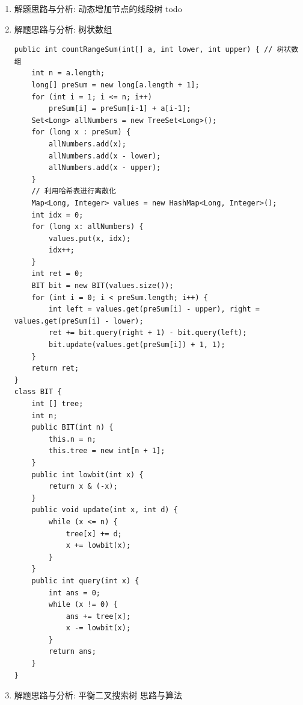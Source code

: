 \documentclass[9pt, b5paaper]{book}
\begin{document}
\begin{enumerate}
\begin{itemize}
\begin{verbatim}
    node.lchild = build(left, mid);
    node.rchild = build(mid + 1, right);
    return node;
}
public int count(SegNode root, int left, int right) {
    if (left > root.hi || right < root.lo) 
        return 0;
    if (left <= root.lo && root.hi <= right) 
        return root.add;
    return count(root.lchild, left, right) + count(root.rchild, left, right);
}
public void insert(SegNode root, int val) {
    root.add++;
    if (root.lo == root.hi) 
        return;
    int mid = (root.lo + root.hi) / 2;
    if (val <= mid) 
        insert(root.lchild, val);
    else insert(root.rchild, val);
}
class SegNode {
    int lo, hi, add;
    SegNode lchild, rchild;
    public SegNode(int left, int right) {
        lo = left;
        hi = right;
        add = 0;
        lchild = null;
        rchild = null;
    }
}
\end{verbatim}
\end{itemize}
\item 解题思路与分析: 动态增加节点的线段树 todo
\label{sec-1-0-4-3}
\item 解题思路与分析: 树状数组
\label{sec-1-0-4-4}
\begin{verbatim}
public int countRangeSum(int[] a, int lower, int upper) { // 树状数组
    int n = a.length;
    long[] preSum = new long[a.length + 1];
    for (int i = 1; i <= n; i++) 
        preSum[i] = preSum[i-1] + a[i-1];
    Set<Long> allNumbers = new TreeSet<Long>();
    for (long x : preSum) {
        allNumbers.add(x);
        allNumbers.add(x - lower);
        allNumbers.add(x - upper);
    }
    // 利用哈希表进行离散化
    Map<Long, Integer> values = new HashMap<Long, Integer>();
    int idx = 0;
    for (long x: allNumbers) {
        values.put(x, idx);
        idx++;
    }
    int ret = 0;
    BIT bit = new BIT(values.size());
    for (int i = 0; i < preSum.length; i++) {
        int left = values.get(preSum[i] - upper), right = values.get(preSum[i] - lower);
        ret += bit.query(right + 1) - bit.query(left);
        bit.update(values.get(preSum[i]) + 1, 1);
    }
    return ret;
}
class BIT {
    int [] tree;
    int n;
    public BIT(int n) {
        this.n = n;
        this.tree = new int[n + 1];
    }
    public int lowbit(int x) {
        return x & (-x);
    }
    public void update(int x, int d) {
        while (x <= n) {
            tree[x] += d;
            x += lowbit(x);
        }
    }
    public int query(int x) {
        int ans = 0;
        while (x != 0) {
            ans += tree[x];
            x -= lowbit(x);
        }
        return ans;
    }
}
\end{verbatim}
\item 解题思路与分析: 平衡二叉搜索树
\label{sec-1-0-4-5}
思路与算法


\end{enumerate}
\end{document}
